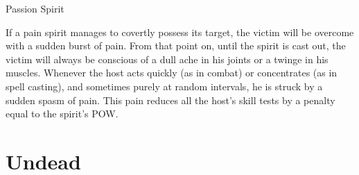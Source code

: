 \begin{monsterbox}{Passion Spirit}
\begin{rpg-monsteraction}
	\end{rpg-monsteraction}
	\begin{rpg-monsteraction}
		If a pain spirit manages to covertly possess its target, the victim will be overcome with a sudden burst of pain. From that point on, until the spirit is cast out, the victim will always be conscious of a dull ache in his joints or a twinge in his muscles. Whenever the host acts quickly (as in combat) or concentrates (as in spell casting), and sometimes purely at random intervals, he is struck by a sudden spasm of pain. This pain reduces all the host’s skill tests by a penalty equal to the spirit’s POW.
	\end{rpg-monsteraction}
\end{monsterbox}


\section{Undead}
\label{sec:undead}




